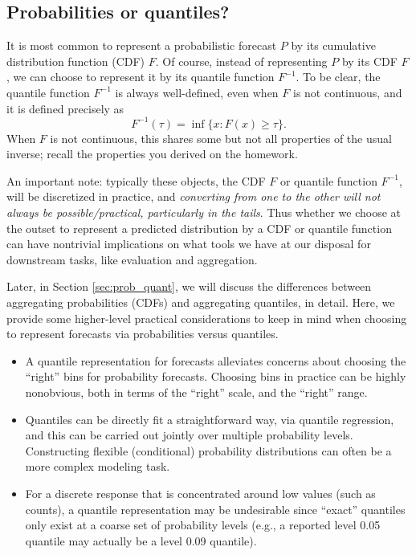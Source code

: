 \documentclass{article}
\begin{document}
\subsection{Probabilities or quantiles?}

It is most common to represent a probabilistic forecast $P$ by its cumulative
distribution function (CDF) $F$. Of course, instead of representing $P$ by its
CDF $F$, we can choose to represent it by its quantile function
$F^{-1}$. To be clear, the quantile function $F^{-1}$ is always well-defined,
even when $F$ is not continuous, and it is defined precisely as
\[
F^{-1}(\tau) = \inf\{ x : F(x) \geq \tau\}.
\]
When $F$ is not continuous, this shares some but not all properties of the 
usual inverse; recall the properties you derived on the homework.

An important note: typically these objects, the CDF $F$ or quantile function
$F^{-1}$, will be discretized in practice, and \emph{converting from one to the
  other will not always be possible/practical, particularly in the tails}. Thus
whether we choose at the outset to represent a predicted distribution by a CDF
or quantile function can have nontrivial implications on what tools we have at
our disposal for downstream tasks, like evaluation and aggregation.

Later, in Section \ref{sec:prob_quant}, we will discuss the differences between
aggregating probabilities (CDFs) and aggregating quantiles, in detail. Here, we
provide some higher-level practical considerations to keep in mind when choosing
to represent forecasts via probabilities versus quantiles.  

\begin{itemize}
\item A quantile representation for forecasts alleviates concerns about choosing
  the ``right'' bins for probability forecasts. Choosing bins in practice can be
  highly nonobvious, both in terms of the ``right''  scale, and the ``right''
  range.  

\item Quantiles can be directly fit a straightforward way, via quantile
  regression, and this can be carried out jointly over multiple probability
  levels. Constructing flexible (conditional) probability distributions can
  often be a more complex modeling task.  

\item For a discrete response that is concentrated around low values (such as 
  counts), a quantile representation may be undesirable since ``exact''
  quantiles only exist at a coarse set of probability levels (e.g., a reported
  level 0.05 quantile may actually be a level 0.09 quantile).     
\end{itemize}
\end{document}
